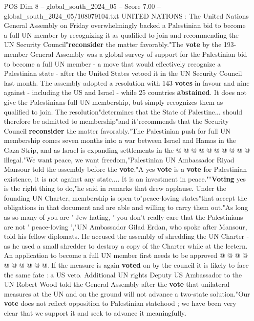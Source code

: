 \begin{textsample}{POS Dim 8 – global\_south\_2024\_05 – Score 7.00 – global\_south\_2024\_05/108079104.txt}  \label{ex:f8_pos_222}
UNITED NATIONS : The United Nations General Assembly on Friday overwhelmingly backed a Palestinian bid to become a full UN member by recognizing it as qualified to join and recommending the UN Security Council"\textbf{reconsider} the matter favorably."The \textbf{vote} by the 193-member General Assembly was a global survey of support for the Palestinian bid to become a full UN member - a move that would effectively recognize a Palestinian state - after the United States vetoed it in the UN Security Council last month.
The assembly adopted a resolution with 143 \textbf{votes} in favour and nine against - including the US and Israel - while 25 countries \textbf{abstained}.
It does not give the Palestinians full UN membership, but simply recognizes them as qualified to join.
The resolution"determines that the State of Palestine... should therefore be admitted to membership"and it"recommends that the Security Council \textbf{reconsider} the matter favorably."The Palestinian push for full UN membership comes seven months into a war between Israel and Hamas in the Gaza Strip, and as Israel is expanding settlements in the @ @ @ @ @ @ @ @ @ @ illegal."We want peace, we want freedom,"Palestinian UN Ambassador Riyad Mansour told the assembly before the \textbf{vote}."A yes \textbf{vote} is a \textbf{vote} for Palestinian existence, it is not against any state....
It is an investment in peace.""\textbf{Voting} yes is the right thing to do,"he said in remarks that drew applause.
Under the founding UN Charter, membership is open to"peace-loving states"that accept the obligations in that document and are able and willing to carry them out."As long as so many of you are ' Jew-hating, ' you don't really care that the Palestinians are not ' peace-loving ',"UN Ambassador Gilad Erdan, who spoke after Mansour, told his fellow diplomats.
He accused the assembly of shredding the UN Charter - as he used a small shredder to destroy a copy of the Charter while at the lectern.
An application to become a full UN member first needs to be approved @ @ @ @ @ @ @ @ @ @.
If the measure is again \textbf{voted} on by the council it is likely to face the same fate : a US veto.
Additional UN rights Deputy US Ambassador to the UN Robert Wood told the General Assembly after the \textbf{vote} that unilateral measures at the UN and on the ground will not advance a two-state solution."Our \textbf{vote} does not reflect opposition to Palestinian statehood ; we have been very clear that we support it and seek to advance it meaningfully.

\end{textsample}
